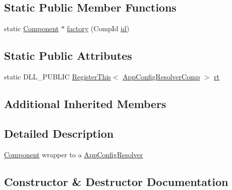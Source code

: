 \subsection*{Static Public Member Functions}
\begin{DoxyCompactItemize}
\item 
static \hyperlink{classtheoria_1_1core_1_1Component}{Component} $\ast$ \hyperlink{classtheoria_1_1core_1_1AppConfigResolverComp_aa439f83c466b28a3d1df82cc106f87b4}{factory} (Comp\+Id \hyperlink{classtheoria_1_1core_1_1Component_ab539df9f996efceda7743fa1b69cd25d}{id})
\end{DoxyCompactItemize}
\subsection*{Static Public Attributes}
\begin{DoxyCompactItemize}
\item 
static D\+L\+L\+\_\+\+P\+U\+B\+L\+IC \hyperlink{classtheoria_1_1core_1_1RegisterThis}{Register\+This}$<$ \hyperlink{classtheoria_1_1core_1_1AppConfigResolverComp}{App\+Config\+Resolver\+Comp} $>$ \hyperlink{classtheoria_1_1core_1_1AppConfigResolverComp_a25d3ff11e2e50221cd2755fbc8feb313}{rt}
\end{DoxyCompactItemize}
\subsection*{Additional Inherited Members}


\subsection{Detailed Description}
\hyperlink{classtheoria_1_1core_1_1Component}{Component} wrapper to a \hyperlink{classtheoria_1_1core_1_1AppConfigResolver}{App\+Config\+Resolver} 

\subsection{Constructor \& Destructor Documentation}
\mbox{\label{classtheoria_1_1core_1_1AppConfigResolverComp_a49f449b95efaa632d5398b161b28144e}} 
